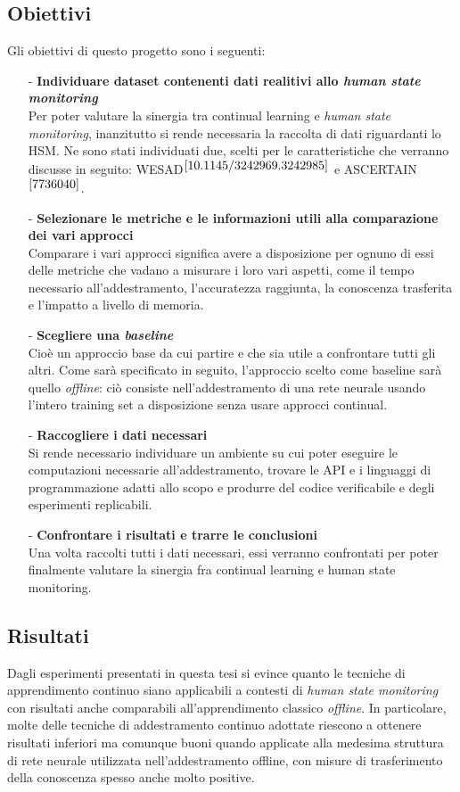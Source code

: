 \subsection*{Obiettivi}
Gli obiettivi di questo progetto sono i seguenti:
\begin{itemize}
    \item[-] \textbf{Individuare dataset contenenti dati realitivi allo \textit{human state monitoring}}\\
    Per poter valutare la sinergia tra continual learning e \textit{human state monitoring}, inanzitutto si rende necessaria la raccolta di dati riguardanti lo HSM. Ne sono stati individuati due, scelti per le caratteristiche che verranno discusse in seguito: WESAD$^{\cite{10.1145/3242969.3242985}}$ e ASCERTAIN$^{\cite{7736040}}$.
    \item[-] \textbf{Selezionare le metriche e le informazioni utili alla comparazione dei vari approcci}\\
    Comparare i vari approcci significa avere a disposizione per ognuno di essi delle metriche che vadano a misurare i loro vari aspetti, come il tempo necessario all'addestramento, l'accuratezza raggiunta, la conoscenza trasferita e l'impatto a livello di memoria.
    \item[-] \textbf{Scegliere una \textit{baseline}}\\
    Cioè un approccio base da cui partire e che sia utile a confrontare tutti gli altri. Come sarà specificato in seguito, l'approccio scelto come baseline sarà quello \textit{offline}: ciò consiste nell'addestramento di una rete neurale usando l'intero training set a disposizione senza usare approcci continual.
    \item[-] \textbf{Raccogliere i dati necessari}\\
    Si rende necessario individuare un ambiente su cui poter eseguire le computazioni necessarie all'addestramento, trovare le API e i linguaggi di programmazione adatti allo scopo e produrre del codice verificabile e degli esperimenti replicabili.
    \item[-] \textbf{Confrontare i risultati e trarre le conclusioni}\\
    Una volta raccolti tutti i dati necessari, essi verranno confrontati per poter finalmente valutare la sinergia fra continual learning e human state monitoring.
\end{itemize}

\subsection*{Risultati}
Dagli esperimenti presentati in questa tesi si evince quanto le tecniche di apprendimento continuo siano applicabili a contesti di \textit{human state monitoring} con risultati anche comparabili all'apprendimento classico \textit{offline}. In particolare, molte delle tecniche di addestramento continuo adottate riescono a ottenere risultati inferiori ma comunque buoni quando applicate alla medesima struttura di rete neurale utilizzata nell'addestramento offline, con misure di trasferimento della conoscenza spesso anche molto positive.

